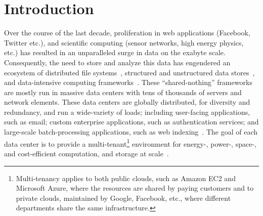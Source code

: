 \documentclass[a4paper,12pt,twoside,openright]{report}
\begin{document}
\pagestyle{empty}
\singlespacing

\onehalfspacing

\onehalfspacing

\singlespacing


\setcounter{page}{0}
\pagestyle{plain}
\tableofcontents
\listoffigures
\listoftables

\onehalfspacing


\chapter{Introduction}
\setcounter{page}{1} 

Over the course of the last decade, proliferation in web applications (Facebook,
Twitter etc.), and scientific computing (sensor networks, high energy physics,
etc.) has resulted in an unparalleled surge in data on the exabyte scale.
Consequently, the need to store and analyze this data has engendered an
ecosystem of distributed file systems~\cite{Ghemawat:2003:GFS}, structured and
unstructured data stores~\cite{Chang:2006:BDS,DeCandia:2007:DAH}, and
data-intensive computing
frameworks~\cite{Dean:2004:MSD,Isard:2007:DDD,Murray:2011:CUE}. These
``shared-nothing'' frameworks are mostly run in massive data centers with tens
of thousands of servers and network elements. These data centers are globally
distributed, for diversity and redundancy, and run a wide-variety of loads;
including user-facing applications, such as email; custom enterprise
applications, such as authentication services; and large-scale batch-processing
applications, such as web indexing~\cite{Benson:2010:NTC}. The goal of each data
center is to provide a multi-tenant\footnote{Multi-tenancy applies to both
public clouds, such as Amazon EC2 and Microsoft Azure, where the resources are
shared by paying customers and to private clouds, maintained by Google,
Facebook, etc., where different departments share the same infrastructure.}
environment for energy-, power-, space-, and cost-efficient computation, and
storage at scale~\cite{Katz:2009:TTB}.
\end{document}
